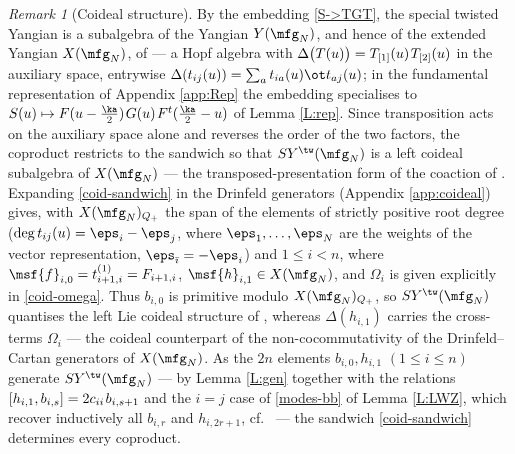 \documentclass{amsart}
\numberwithin{equation}{section}
\theoremstyle{remark}
\newtheorem{remark}[theorem]{Remark}
\renewcommand{\,}{\kern 0.1em} %
\begin{document}
\begin{remark}[Coideal structure] \label{R:coideal}
%
By the embedding \eqref{S->TGT}, the special twisted Yangian is a subalgebra of the Yangian $Y(\mfg_N)$, and hence of the extended Yangian $X(\mfg_N)$, of \cite{AMR06} --- a Hopf algebra with $\Delta\big(T(u)\big) = T_{[1]}(u)\,T_{[2]}(u)$ in the auxiliary space, entrywise $\Delta(t_{ij}(u)) = \sum_{a} t_{ia}(u) \ot t_{aj}(u)$; in the fundamental representation of Appendix \ref{app:Rep} the embedding specialises to $S(u) \mapsto F(u-\tfrac\ka2)\,G(u)\,F^t(\tfrac\ka2-u)$ of Lemma \ref{L:rep}. Since transposition acts on the auxiliary space alone and reverses the order of the two factors, the coproduct restricts to the sandwich
%
%
so that $SY^{\tw}(\mfg_N)$ is a left coideal subalgebra of $X(\mfg_N)$ --- the transposed-presentation form of the coaction of \cite{GR16}. Expanding \eqref{coid-sandwich} in the Drinfeld generators (Appendix \ref{app:coideal}) gives, with $X(\mfg_N)_{Q_+}$ the span of the elements of strictly positive root degree ($\deg t_{ij}(u) = \eps_i-\eps_j$, where $\eps_1,\ldots,\eps_N$ are the weights of the vector representation, $\eps_{\bar\imath} = -\eps_i$) and $1\le i<n$,
%
%
where $\msf{f}_{i,0} = t^{(1)}_{i+1,i} = F_{i+1,i}$, $\msf{h}_{i,1} \in X(\mfg_N)$, and $\Omega_i$ is given explicitly in \eqref{coid-omega}. Thus $b_{i,0}$ is primitive modulo $X(\mfg_N)_{Q_+}$, so $SY^{\tw}(\mfg_N)$ quantises the left Lie coideal structure of \cite{GR16}, whereas $\Delta(h_{i,1})$ carries the cross-terms $\Omega_i$ --- the coideal counterpart of the non-cocommutativity of the Drinfeld--Cartan generators of $X(\mfg_N)$. As the $2n$ elements $b_{i,0}, h_{i,1}$ $(1\le i\le n)$ generate $SY^{\tw}(\mfg_N)$ --- by Lemma \ref{L:gen} together with the relations $[h_{i,1},b_{i,s}]=2c_{ii}\,b_{i,s+1}$ and the $i=j$ case of \eqref{modes-bb} of Lemma \ref{L:LWZ}, which recover inductively all $b_{i,r}$ and $h_{i,2r+1}$, cf.~\cite[Lem.~2.8]{Lu26a} --- the sandwich \eqref{coid-sandwich} determines every coproduct.


\end{remark}
\end{document}
